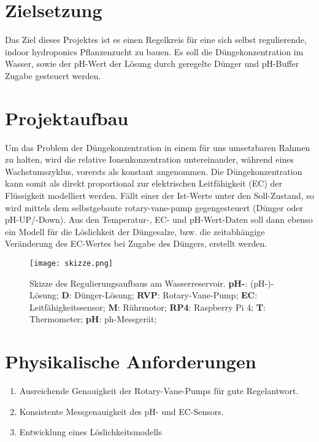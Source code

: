 
\section*{Zielsetzung}
Das Ziel dieses Projektes ist es einen Regelkreis für eine sich selbst regulierende, indoor hydroponics Pflanzenzucht zu bauen.
Es soll die Düngekonzentration im Wasser, sowie der pH-Wert der Lösung durch geregelte Dünger und pH-Buffer Zugabe gesteuert werden.

\section*{Projektaufbau}
Um das Problem der Düngekonzentration in einem für uns umsetzbaren Rahmen zu halten, wird die relative Ionenkonzentration untereinander, während eines Wachstumszyklus, vorersts als konstant angenommen.
Die Düngekonzentration kann somit als direkt proportional zur elektrischen Leitfähigkeit (EC) der Flüssigkeit modelliert werden.
Fällt einer der Ist-Werte unter den Soll-Zustand, so wird mittels dem selbstgebaute rotary-vane-pump gegengesteuert (Dünger oder pH-UP/-Down).
Aus den Temperatur-, EC- und pH-Wert-Daten soll dann ebenso ein Modell für die Löslichkeit der Düngesalze, bzw. die zeitabhängige Veränderung des EC-Wertes bei Zugabe des Düngers, erstellt werden.

\begin{figure}[H]
    \centering
    \texttt{[image: skizze.png]}
    \caption{
        Skizze des Regulierungsaufbaus am Wasserreservoir.
        \textbf{pH-}: (pH-)-Lösung; 
        \textbf{D}: Dünger-Lösung; 
        \textbf{RVP}: Rotary-Vane-Pump; 
        \textbf{EC}: Leitfähigkeitssensor; 
        \textbf{M}: Rührmotor; 
        \textbf{RP4}: Raspberry Pi 4; 
        \textbf{T}: Thermometer; 
        \textbf{pH}: ph-Messgerät;
    }
\end{figure}

\section*{Physikalische Anforderungen}
\begin{enumerate}
    \item Ausreichende Genauigkeit der Rotary-Vane-Pumps für gute Regelantwort.
    \item Konsistente Messgenauigkeit des pH- und EC-Sensors.
    \item Entwicklung eines Löslichkeitsmodells
\end{enumerate}


